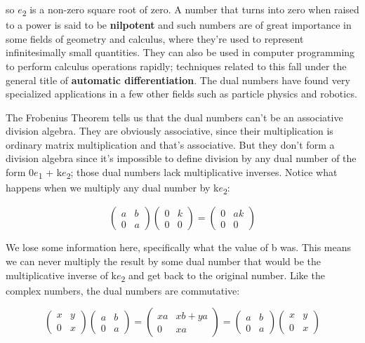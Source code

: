 \documentclass[oneside,english]{amsbook}
\numberwithin{section}{chapter}
\theoremstyle{plain}
\theoremstyle{definition}
\begin{document}
so $e$\textsubscript{2} is a non-zero square root of zero. A number
that turns into zero when raised to a power is said to be
\textbf{nilpotent} and such numbers are of great importance in some
fields of geometry and calculus, where they're used to represent
infinitesimally small quantities. They can also be used in computer
programming to perform calculus operations rapidly; techniques related
to this fall under the general title of \textbf{automatic
	differentiation}. The dual numbers have found very specialized
applications in a few other fields such as particle physics and
robotics.

The Frobenius Theorem tells us that the dual numbers can't be an
associative division algebra. They are obviously associative, since
their multiplication is ordinary matrix multiplication and that's
associative. But they don't form a division algebra since it's
impossible to define division by any dual number of the form
0$e$\textsubscript{1} + k$e$\textsubscript{2}; those dual numbers
lack multiplicative inverses. Notice what happens when we multiply any
dual number by k$e$\textsubscript{2}:

\[\begin{pmatrix}
	a & b \\
	0 & a
\end{pmatrix}\begin{pmatrix}
	0 & k \\
	0 & 0
\end{pmatrix} = \begin{pmatrix}
	0 & ak \\
	0 & 0
\end{pmatrix}\]

We lose some information here, specifically what the value of b was.
This means we can never multiply the result by some dual number that
would be the multiplicative inverse of k$e$\textsubscript{2} and get
back to the original number. Like the complex numbers, the dual numbers
are commutative:

\[\begin{pmatrix}
	x & y \\
	0 & x
\end{pmatrix}\begin{pmatrix}
	a & b \\
	0 & a
\end{pmatrix} = \begin{pmatrix}
	xa & xb + ya \\
	0 & xa
\end{pmatrix} = \begin{pmatrix}
	a & b \\
	0 & a
\end{pmatrix}\begin{pmatrix}
	x & y \\
	0 & x
\end{pmatrix}\]
\end{document}
